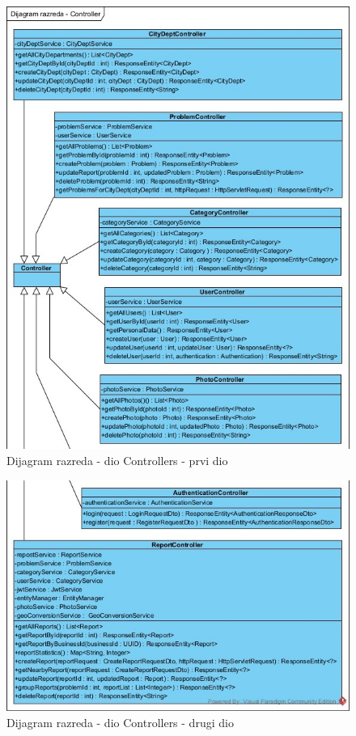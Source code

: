 \begin{figure}[H]
	\includegraphics[scale=1.0]{slike/DR-controller1} %
	\centering
	\caption{Dijagram razreda - dio Controllers - prvi dio}
	\label{fig:DijagramRazredaControllers}
\end{figure}

\begin{figure}[H]
	\includegraphics[scale=1.0]{slike/DR-controller2} %
	\centering
	\caption{Dijagram razreda - dio Controllers - drugi dio}
	\label{fig:DijagramRazredaControllers}
\end{figure}

